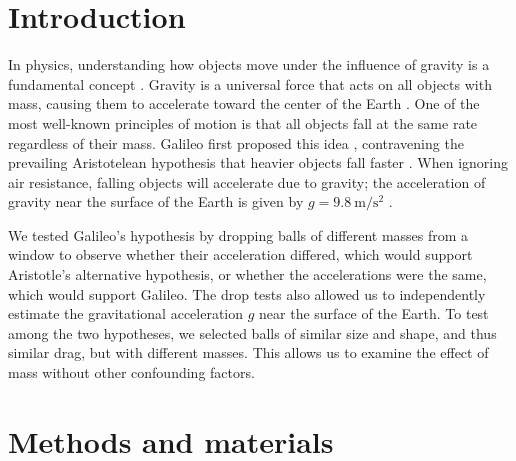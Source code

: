 \documentclass[reprint,amsmath,amssymb,aps,twoside]{revtex4-2}
\begin{document}
	



\section{Introduction}
In physics, understanding how objects move under the influence of gravity is a fundamental concept \cite{tipler,openstax,barrons}. Gravity is a universal force that acts on all objects with mass, causing them to accelerate toward the center of the Earth \cite{tipler, openstax, barrons}. One of the most well-known principles of motion is that all objects fall at the same rate regardless of their mass. Galileo first proposed this idea \cite{galilei:1638:discorsi, machamer:2021:galileo}, contravening the prevailing Aristotelean hypothesis that heavier objects fall faster \cite{aristotle:physics}. When ignoring air resistance, falling objects will accelerate due to gravity; the acceleration of gravity near the surface of the Earth is given by $g = \qty{9.8}{\meter\per\second\squared}$ \cite{tipler,openstax,barrons}. 

We tested Galileo's hypothesis by dropping balls of different masses from a window to observe whether their acceleration differed, which would support Aristotle's alternative hypothesis, or whether the accelerations were the same, which would support Galileo. The drop tests also allowed us to independently estimate the gravitational acceleration $g$ near the surface of the Earth. To test among the two hypotheses, we selected balls of similar size and shape, and thus similar drag, but with different masses. This allows us to examine the effect of mass without other confounding factors. 







\section{Methods and materials}
\end{document}
